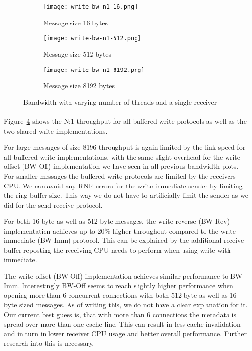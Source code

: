 \begin{figure}[ht]
  \centering
\begin{subfigure}[b]{0.49\textwidth}
  \centering
  \texttt{[image: write-bw-n1-16.png]}
  \caption{Message size 16 bytes}
  \label{fig:plot-write-bw-n1-16}
\end{subfigure}
\begin{subfigure}[b]{0.49\textwidth}
  \centering
  \texttt{[image: write-bw-n1-512.png]}
  \caption{Message size 512 bytes}
  \label{fig:plot-write-bw-n1-512}
\end{subfigure}
\begin{subfigure}[b]{0.49\textwidth}
  \centering
  \texttt{[image: write-bw-n1-8192.png]}
  \caption{Message size 8192 bytes}
  \label{fig:plot-write-bw-n1-8192}
\end{subfigure}
  \caption{Bandwidth with varying number of threads and a single receiver}
  \label{fig:plot-write-bw-n1}
\end{figure}

\paragraph{} Figure~\ref{fig:plot-write-bw-n1} shows the N:1 throughput for all buffered-write protocols as 
well as the two shared-write implementations.

For large messages of size 8196 throughput is again limited by the link speed for all buffered-write implementations, 
with the same slight overhead for the write offset (BW-Off) implementation we have seen in all previous bandwidth plots.
For smaller messages the buffered-write protocols are limited by the receivers CPU. We can avoid any 
RNR errors for the write immediate sender by limiting the ring-buffer size. This way we do not have to artificially limit 
the sender as we did for the send-receive protocol.

For both 16 byte as well as 512 byte messages, the write reverse \mbox{(BW-Rev)} implementation achieves up to 20\% higher throughout
compared to the write immediate (BW-Imm) protocol. This can be explained by the additional receive buffer reposting the 
receiving CPU needs to perform when using write with immediate. 

The write offset (BW-Off) implementation achieves similar performance to BW-Imm. Interestingly BW-Off seems to reach
slightly higher performance when opening more than 6 concurrent connections with both 512 byte as well as 16 byte
sized messages. As of
writing this, we do not have a clear explanation for it. Our current best guess is, that with more than 6 connections the 
metadata is spread over more than one cache line. This can result in less cache invalidation and in turn in lower receiver 
CPU usage and better overall performance. Further research into this is necessary. 


